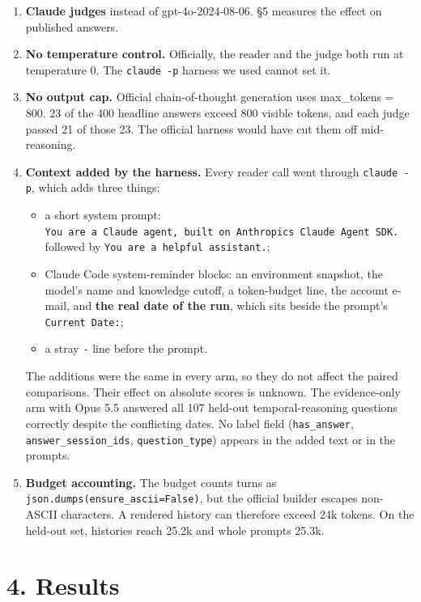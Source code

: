 \documentclass[11pt]{article}
\providecommand{\tightlist}{\setlength{\itemsep}{0pt}\setlength{\parskip}{0pt}}
\begin{document}
\begin{enumerate}
\def\labelenumi{\arabic{enumi}.}
\tightlist
\item
  \textbf{Claude judges} instead of gpt-4o-2024-08-06. §5 measures the effect on published answers.
\item
  \textbf{No temperature control.} Officially, the reader and the judge both run at temperature 0. The
  \texttt{claude\ -p} harness we used cannot set it.
\item
  \textbf{No output cap.} Official chain-of-thought generation uses max\_tokens = 800. 23 of the 400 headline
  answers exceed 800 visible tokens, and each judge passed 21 of those 23. The official harness would have
  cut them off mid-reasoning.
\item
  \textbf{Context added by the harness.} Every reader call went through \texttt{claude\ -p}, which adds three things:

  \begin{itemize}
  \tightlist
  \item
    a short system prompt: \texttt{You\ are\ a\ Claude\ agent,\ built\ on\ Anthropic\textquotesingle{}s\ Claude\ Agent\ SDK.} followed by
    \texttt{You\ are\ a\ helpful\ assistant.};
  \item
    Claude Code system-reminder blocks: an environment snapshot, the model's name and knowledge cutoff, a
    token-budget line, the account e-mail, and \textbf{the real date of the run}, which sits beside the
    prompt's \texttt{Current\ Date:};
  \item
    a stray \texttt{-} line before the prompt.
  \end{itemize}

  The additions were the same in every arm, so they do not affect the paired comparisons. Their effect on
  absolute scores is unknown. The evidence-only arm with Opus 5.5 answered all 107 held-out
  temporal-reasoning questions correctly despite the conflicting dates. No label field (\texttt{has\_answer},
  \texttt{answer\_session\_ids}, \texttt{question\_type}) appears in the added text or in the prompts.
\item
  \textbf{Budget accounting.} The budget counts turns as \texttt{json.dumps(ensure\_ascii=False)}, but the official
  builder escapes non-ASCII characters. A rendered history can therefore exceed 24k tokens. On the
  held-out set, histories reach 25.2k and whole prompts 25.3k.
\end{enumerate}

\hypertarget{results}{%
\section{4. Results}\label{results}}
\end{document}
